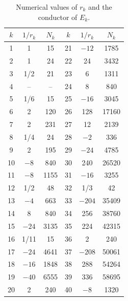 \documentclass[12pt]{amsart}%
\newcommand{\1}{\mathds{1}}
\theoremstyle{definition}
\numberwithin{equation}{section}
\numberwithin{table}{section}
\numberwithin{figure}{section}
\begin{document}
\begin{table}[h]
\centering
\begin{tabular}{ccc||ccc}
\hline
$k$ & $1/r_k$ & $N_k$ & $k$ & $1/r_k$ & $N_k$ \\
\hline
1  & 1     & 15   & 21 & $-12$  & 1785  \\
2  & 1     & 24   & 22 & 24     & 3432  \\
3  & 1/2   & 21   & 23 & 6      & 1311  \\
4  & --    & --   & 24 & 8      & 840   \\
5  & 1/6   & 15   & 25 & $-16$  & 3045  \\
6  & 2     & 120  & 26 & 128    & 17160 \\
7  & 2     & 231  & 27 & 12     & 2139  \\
8  & 1/4   & 24   & 28 & $-2$   & 336   \\
9  & 2     & 195  & 29 & $-24$  & 4785  \\
10 & $-8$  & 840  & 30 & 240    & 26520 \\
11 & $-8$  & 1155 & 31 & $-16$  & 3255  \\
12 & 1/2   & 48   & 32 & 1/3    & 42    \\
13 & $-4$  & 663  & 33 & $-204$ & 35409 \\
14 & 8     & 840  & 34 & 256    & 38760 \\
15 & $-24$ & 3135 & 35 & 224    & 42315 \\
16 & 1/11  & 15   & 36 & 2      & 240   \\
17 & $-24$ & 4641 & 37 & $-208$ & 50061 \\
18 & $-16$ & 1848 & 38 & 288    & 54264 \\
19 & $-40$ & 6555 & 39 & 336    & 58695 \\
20 & 2     & 240  & 40 & $-8$   & 1320  \\
\hline
\end{tabular}
\caption{Numerical values of $r_k$ and the conductor of $E_k$.\label{table-conj}}
\end{table}
\end{document}
